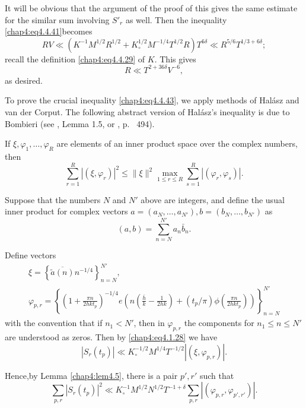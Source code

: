 It will be obvious that the argument of the proof of this gives the same estimate for the similar sum involving $S'_r$ as well. Then the inequality \eqref{chap4:eq4.4.41}\pageoriginale becomes 
$$
RV\ll\left(K^{-1}M^{1/2}R^{1/2}+K_\circ^{1/2}M^{-1/4}T^{1/2}R\right)T^{6\delta}\ll R^{5/6}T^{1/3+6\delta};
$$
recall the definition \eqref{chap4:eq4.4.29} of $K$. This gives
$$
R\ll T^{2+36\delta}V^{-6},
$$
as desired.

To prove the crucial inequality \eqref{chap4:eq4.4.43}, we apply methods of Hal\'asz and van der Corput. The following abstract version of Hal\'asz's inequality is due to Bombieri (see \cite{key23}, Lemma 1.5, or \cite{key13}, p.~ 494).

\begin{lem}\label{chap4:lem4.5}
If $\xi,\varphi_1,\ldots,\varphi_R$ are elements of an inner product space over the complex numbers, then 
$$
\sum\limits_{r=1}^R\left|\left(\xi,\varphi_r\right)\right|^2\leq\parallel\xi \parallel^2\underset{1\leq r\leq R}{\max}\sum\limits_{s=1}^R\left|\left( \varphi_r,\varphi_s\right)\right|.
$$
\end{lem}

Suppose that the numbers $N$ and $N'$ above are integers, and define the usual inner product for complex vectors $a=(a_N,\ldots,a_{N'}), b=(b_N,\ldots,b_{N'})$ as 
$$
(a,b)=\sum\limits_{n=N}^{N'}a_n\bar{b}_n.
$$

Define vectors
\begin{gather*}
\xi=\left\{\overline{\tilde{a}(n)}n^{-1/4}\right\}_{n=N}^{N'},\\
\varphi_{p,r}=\left\{\left(1+\frac{\pi n}{2hkt_p}\right)^{-1/4}e\left(n\left( \frac{\bar{h}}{k}-\frac{1}{2hk}\right)+\left(t_p/\pi\right)\phi\left(\frac{\pi n}{2hkt_p}\right)\right)\right\}_{n=N}^{N'}
\end{gather*}
with the convention that if $n_1<N'$, then in $\varphi_{p,r}$ the components for $n_1\leq n\leq N'$ are understood as zeros. Then by \eqref{chap4:eq4.1.28} we have 
$$
\left|S_r(t_p)\right|\ll K_\circ^{-1/2}M^{1/4}T^{-1/2}\left|\left(\xi,\varphi_{p,r} \right)\right|.
$$

Hence,\pageoriginale by Lemma \ref{chap4:lem4.5}, there is a pair $p',r'$ such that 
\begin{equation}\label{chap4:eq4.4.44}
\sum\limits_{p,r}\left| S_r(t_p)\right|^2 \ll K_\circ^{-1}M^{1/2}N^{1/2}T^{-1+\delta} \sum\limits_{p,r}\left| \left( \varphi_{p,r},\varphi_{p',r'}\right)\right|.
\end{equation}

